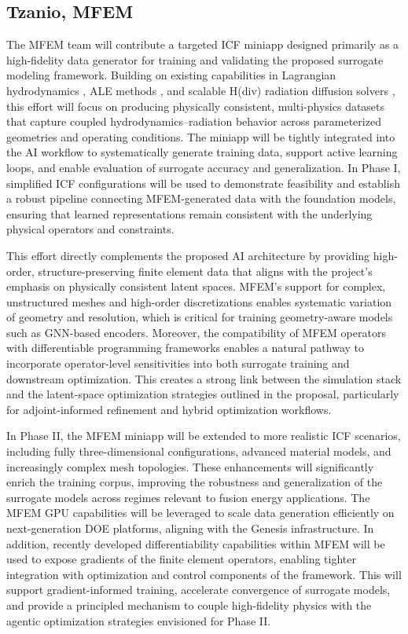 \subsection{Tzanio, MFEM}

The MFEM team will contribute a targeted ICF miniapp designed primarily as a high-fidelity data generator for training and validating the proposed surrogate modeling framework. Building on existing capabilities in Lagrangian hydrodynamics \cite{Dobrev2012}, ALE methods \cite{Tomov2018}, and scalable H(div) radiation diffusion solvers \cite{Pazner2025}, this effort will focus on producing physically consistent, multi-physics datasets that capture coupled hydrodynamics–radiation behavior across parameterized geometries and operating conditions. The miniapp will be tightly integrated into the AI workflow to systematically generate training data, support active learning loops, and enable evaluation of surrogate accuracy and generalization. In Phase I, simplified ICF configurations will be used to demonstrate feasibility and establish a robust pipeline connecting MFEM-generated data with the foundation models, ensuring that learned representations remain consistent with the underlying physical operators and constraints.

This effort directly complements the proposed AI architecture by providing high-order, structure-preserving finite element data that aligns with the project’s emphasis on physically consistent latent spaces. MFEM’s support for complex, unstructured meshes and high-order discretizations enables systematic variation of geometry and resolution, which is critical for training geometry-aware models such as GNN-based encoders. Moreover, the compatibility of MFEM operators with differentiable programming frameworks enables a natural pathway to incorporate operator-level sensitivities into both surrogate training and downstream optimization. This creates a strong link between the simulation stack and the latent-space optimization strategies outlined in the proposal, particularly for adjoint-informed refinement and hybrid optimization workflows.

In Phase II, the MFEM miniapp will be extended to more realistic ICF scenarios, including fully three-dimensional configurations, advanced material models, and increasingly complex mesh topologies. These enhancements will significantly enrich the training corpus, improving the robustness and generalization of the surrogate models across regimes relevant to fusion energy applications. The MFEM GPU capabilities \cite{MFEM2024} will be leveraged to scale data generation efficiently on next-generation DOE platforms, aligning with the Genesis infrastructure. In addition, recently developed differentiability capabilities within MFEM will be used to expose gradients of the finite element operators, enabling tighter integration with optimization and control components of the framework. This will support gradient-informed training, accelerate convergence of surrogate models, and provide a principled mechanism to couple high-fidelity physics with the agentic optimization strategies envisioned for Phase II.
